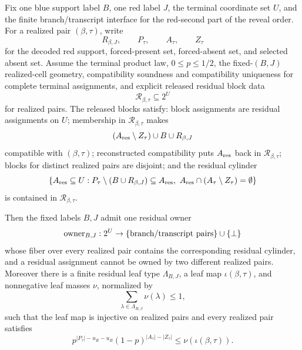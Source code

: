 \begin{helper}
Fix one blue support label \(B\), one red label \(J\), the terminal
coordinate set \(U\), and the finite branch/transcript interface for the
red-second part of the reveal order.  For a realized pair \((\beta,\tau)\),
write
\[
R_{\beta,J},\qquad P_\tau,\qquad A_\tau,\qquad Z_\tau
\]
for the decoded red support, forced-present set, forced-absent set, and
selected absent set.  Assume the terminal product law, \(0\le p\le1/2\),
the fixed-\((B,J)\) realized-cell geometry, compatibility soundness and
compatibility uniqueness for complete terminal assignments, and explicit
released residual block data
\[
\mathcal R_{\beta,\tau}\subseteq 2^U
\]
for realized pairs.  The released blocks satisfy:
block assignments are residual assignments on \(U\); membership in
\(\mathcal R_{\beta,\tau}\) makes
\[
(A_{\rm res}\setminus Z_\tau)\cup B\cup R_{\beta,J}
\]
compatible with \((\beta,\tau)\); reconstructed compatibility puts
\(A_{\rm res}\) back in \(\mathcal R_{\beta,\tau}\); blocks for distinct
realized pairs are disjoint; and the residual cylinder
\[
\{A_{\rm res}\subseteq U:
P_\tau\setminus(B\cup R_{\beta,J})\subseteq A_{\rm res},\
A_{\rm res}\cap(A_\tau\setminus Z_\tau)=\emptyset\}
\]
is contained in \(\mathcal R_{\beta,\tau}\).

Then the fixed labels \(B,J\) admit one residual owner
\[
\operatorname{owner}_{B,J}:2^U\to
  \{\hbox{branch/transcript pairs}\}\cup\{\bot\}
\]
whose fiber over every realized pair contains the corresponding residual
cylinder, and a residual assignment cannot be owned by two different
realized pairs.  Moreover there is a finite residual leaf type
\(\Lambda_{B,J}\), a leaf map \(\iota(\beta,\tau)\), and nonnegative leaf
masses \(\nu\), normalized by
\[
\sum_{\lambda\in\Lambda_{B,J}}\nu(\lambda)\le1,
\]
such that the leaf map is injective on realized pairs and every realized
pair satisfies
\[
p^{|P_\tau|-u_R-u_B}(1-p)^{|A_\tau|-|Z_\tau|}
  \le \nu(\iota(\beta,\tau)).
\]
\end{helper}
